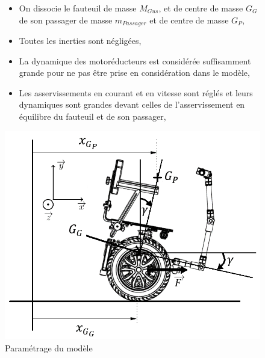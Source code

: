 \begin{figure}[ht!]
\begin{minipage}{0.5\linewidth}
\begin{itemize}
\item On dissocie le fauteuil de masse $M_{Gus}$, et de centre de masse $G_G$ de son passager de masse $m_{Passager}$ et de centre de masse $G_P$,
\item Toutes les inerties sont négligées,
\item La dynamique des motoréducteurs est considérée suffisamment grande pour ne pas être prise en considération dans le modèle,
\item Les asservissements en courant et en vitesse sont réglés et leurs dynamiques sont grandes devant celles de l'asservissement en équilibre du fauteuil et de son passager,
\end{itemize}
\end{minipage}\hfill
\begin{minipage}{0.45\linewidth}
\centering\includegraphics[width=\linewidth]{img/fig16}
\caption{\label{fig16}Paramétrage du modèle}
\end{minipage}
\end{figure}

